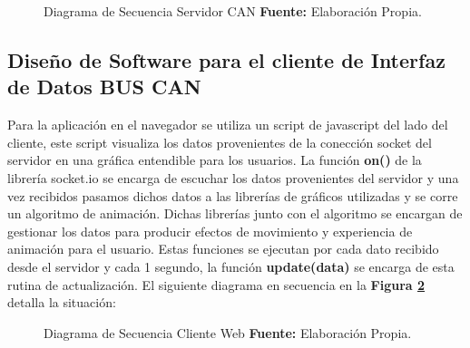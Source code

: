 
\begin{figure}[H]
	\centering
	\begin{center}
		
	\end{center}
	\caption[Diagrama de Secuencia Servidor CAN.]{Diagrama de Secuencia Servidor CAN \textbf{ Fuente:} Elaboración Propia.}
	\label{snode} %
\end{figure}





\subsection{Diseño de Software para el cliente de Interfaz de Datos BUS CAN}


Para la aplicación en el navegador se utiliza un script de  javascript del lado del cliente, este script visualiza los datos provenientes de la conección socket del servidor en una gráfica entendible para los usuarios. La función {\bfseries on()} de la librería socket.io se encarga de escuchar los datos provenientes del servidor y una vez recibidos pasamos dichos datos a las librerías de gráficos utilizadas y se corre un algoritmo de animación.  Dichas librerías junto con el algoritmo se encargan de gestionar los datos para producir efectos de movimiento y experiencia de animación para el usuario. Estas funciones se ejecutan por cada dato recibido desde el servidor y cada 1 segundo, la función {\bfseries update(data)} se encarga de esta rutina de actualización. 
El siguiente diagrama en secuencia en la \textbf{Figura \ref{cweb}} detalla la situación: 

\begin{figure}[H]
	\centering
	\begin{center}
		
	\end{center}
	\caption[Diagrama de Secuencia Cliente Web.]{Diagrama de Secuencia Cliente Web \textbf{ Fuente:} Elaboración Propia.}
	\label{cweb} %
\end{figure}

	


